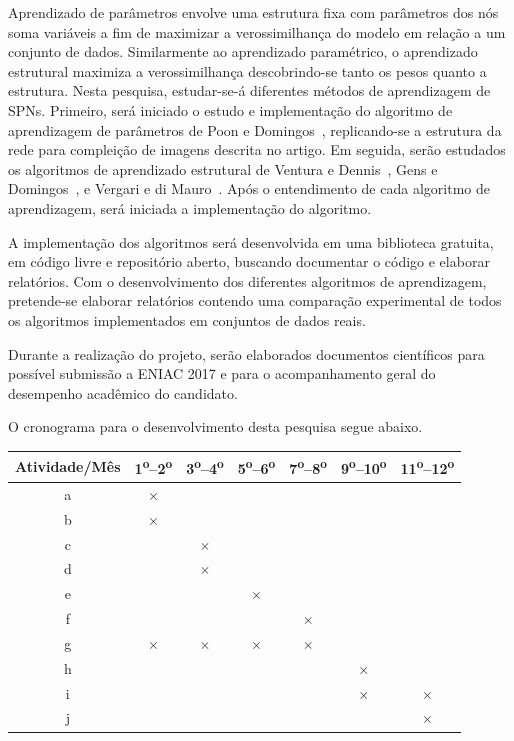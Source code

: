 \documentclass[12pt]{article}
\newcommand{\tsup}{\textsuperscript}
\theoremstyle{plain}
\numberwithin{equation}{section}
\begin{document}
Aprendizado de parâmetros envolve uma estrutura fixa com parâmetros dos nós soma variáveis a fim de
maximizar a verossimilhança do modelo em relação a um conjunto de dados. Similarmente ao
aprendizado paramétrico, o aprendizado estrutural maximiza a verossimilhança descobrindo-se tanto
os pesos quanto a estrutura. Nesta pesquisa, estudar-se-á diferentes métodos de aprendizagem de
SPNs. Primeiro, será iniciado o estudo e implementação do algoritmo de aprendizagem de parâmetros
de Poon e Domingos~\cite{poon-domingos}, replicando-se a estrutura da rede para compleição de
imagens descrita no artigo. Em seguida, serão estudados os algoritmos de aprendizado estrutural
de Ventura e Dennis~\cite{greedy-search}, Gens e Domingos~\cite{gens-domingos}, e Vergari e di
Mauro~\cite{vergari-mauro}. Após o entendimento de cada algoritmo de aprendizagem, será iniciada a
implementação do algoritmo.

A implementação dos algoritmos será desenvolvida em uma biblioteca gratuita, em código livre e
repositório aberto, buscando documentar o código e elaborar relatórios. Com o desenvolvimento dos
diferentes algoritmos de aprendizagem, pretende-se elaborar relatórios contendo uma comparação
experimental de todos os algoritmos implementados em conjuntos de dados reais.

Durante a realização do projeto, serão elaborados documentos científicos para possível submissão a
ENIAC 2017 e para o acompanhamento geral do desempenho acadêmico do candidato.

O cronograma para o desenvolvimento desta pesquisa segue abaixo.

\begin{table}[h]
  \centering
  \begin{tabular}{|c|c|c|c|c|c|c|}
    \hline
    Atividade/Mês & 1\tsup{o}--2\tsup{o} & 3\tsup{o}--4\tsup{o} & 5\tsup{o}--6\tsup{o} &
    7\tsup{o}--8\tsup{o} & 9\tsup{o}--10\tsup{o} & 11\tsup{o}--12\tsup{o} \\ \hline
    a & $\times$ & & & & & \\ \hline
    b & $\times$ & & & & & \\ \hline
    c & & $\times$ & & & & \\ \hline
    d & & $\times$ & & & & \\ \hline
    e & & & $\times$ & & & \\ \hline
    f & & & & $\times$ & & \\ \hline
    g & $\times$ & $\times$ & $\times$ & $\times$ & & \\ \hline
    h & & & & & $\times$ & \\ \hline
    i & & & & & $\times$ & $\times$ \\ \hline
    j & & & & & & $\times$ \\ \hline
  \end{tabular}
\end{table}
\end{document}
